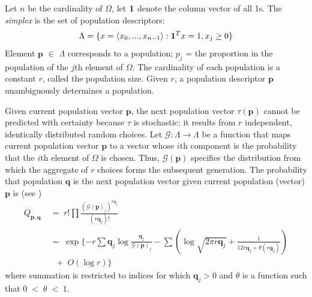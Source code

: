 Let $n$ be the cardinality 
of $\Omega$, let ${\bf1}$ denote the column vector of all 1s. 
The {\em simplex} is the set of population descriptors:
\[
\Lambda = \{x = \langle x_0,...,x_{n-1} \rangle: {\bf1}^T x=1, x_j \geq 0 \} %
\]
Element $\bm{p}$ $\in$ $\Lambda$ corresponds to a population;
$p_j$ = the proportion in the population of the $j$th element of $\Omega$. 
The cardinality of each population is a constant $r$, called the population size. 
Given $r$, a population descriptor $\bm{p}$ unambiguously determines a population.

Given current population vector $\bm{p}$, the next population vector $\tau(\bm{p})$ cannot 
be predicted with certainty because $\tau$ is stochastic; it results from $r$ independent, identically distributed random choices. 
Let $\mathcal{G}:\Lambda \rightarrow \Lambda$ be a function that maps 
current population vector $\bm{p}$ to a vector whose $i$th component 
is the probability that the $i$th element of $\Omega$ is chosen. Thus, $\mathcal{G}(\bm{p})$ 
specifies the distribution from which the aggregate 
of $r$ choices forms the subsequent generation. The probability that population $\bm{q}$ is 
the next population vector given current population (vector) $\bm{p}$ is (see \cite{Vose1999}) 
\begin{equation}
\label{Qmat}
\begin{split}
Q_{\bm{p},\bm{q}} & \;=\; r! \prod \frac{(\mathcal{G}(\bm{p})_j)^{r\bm{q}_j}}{(r\bm{q}_j)!} \\
& \;=\; \exp\{-r \sum \bm{q}_j \log \frac{\bm{q}_j}{\mathcal{G}(\bm{p})_j} - \sum (\log \sqrt{2 \pi r\bm{q}_j}  + \frac{1}{12r\bm{q}_j + \theta (r\bm{q}_j)}) \\      
& \;\;\; + \; O(\log r)\}
\end{split}
\end{equation}
where summation is restricted to indices for which $\bm{q}_j > 0$ and $\theta$ is a function such that $0 \;<\; \theta \;<\; 1$.
